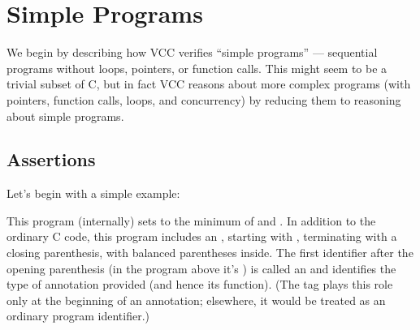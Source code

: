 \section{Simple Programs}
We begin by describing how VCC verifies ``simple programs'' ---
sequential programs without loops, pointers, or function calls. This
might seem to be a trivial subset of C, but in fact VCC reasons about
more complex programs (with pointers, function calls, loops, and
concurrency) by reducing them to reasoning about simple programs.

\subsection{Assertions}
\label{sect:assert-assume}


Let's begin with a simple example:

This program (internally) sets  to the minimum of  and
. In addition to the ordinary C code, this program includes an
, starting with \vcc{_(}, terminating with a closing
parenthesis, with balanced parentheses inside. The first identifier
after the opening parenthesis (in the program above it's )
is called an  and
identifies the type of annotation provided (and hence its function).
(The tag plays this role only 
at the beginning of an annotation; elsewhere, it would be treated as
an ordinary program identifier.)

